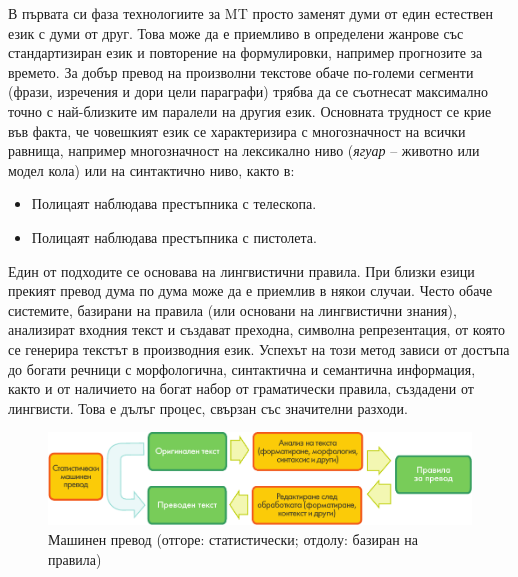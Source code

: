 \documentclass[]{../../metanetpaper}
\begin{document}
\begin{multicols}{2}

В първата си фаза технологиите за MT просто заменят думи от един естествен език с думи от друг. Това може да
 е приемливо в определени жанрове със стандартизиран език и повторение на формулировки, например прогнозите за времето.
 За добър превод на произволни текстове обаче
 по-големи  сегменти (фрази, изречения и дори цели параграфи) трябва да се съотнесат максимално точно с най-близките им паралели на другия
 език. Основната трудност се крие във факта, че
 човешкият език се характеризира с многозначност на 
всички равнища,
 например
 многозначност на лексикално ниво ({\it ягуар} – животно
 или модел кола) или на
 синтактично ниво, както в:

\begin{itemize}
\item Полицаят наблюдава престъпника с телескопа.
\item Полицаят наблюдава престъпника с пистолета.
\end{itemize}

Един от подходите се основава на лингвистични правила.
 При близки езици прекият превод дума по дума може да е приемлив в някои случаи. Често обаче системите,
 базирани на правила (или основани на лингвистични знания),
 анализират входния текст и създават преходна, символна
 репрезентация, от която се генерира текстът в
 производния език. Успехът на този метод зависи от
 достъпа до богати речници с морфологична, синтактична
 и семантична информация, както и от наличието на
 богат набор от граматически правила, създадени от лингвисти.
 Това е дълъг процес, свързан със значителни разходи.

\begin{figure}[htb]
  \center
  \includegraphics[width=\textwidth]{../_media/bulgarian/machine_translation}
  \vspace{-2mm}
  \caption{Машинен превод (отгоре: статистически; отдолу: базиран на правила)}
  \label{fig:mtarch_de}
\end{figure}


\end{multicols}
\end{document}

